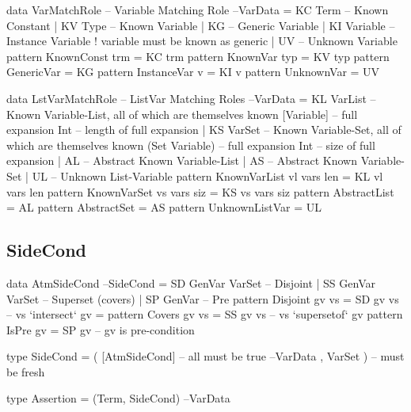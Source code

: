 \begin{code}
data VarMatchRole -- Variable Matching Role                          --VarData
  =  KC Term     -- Known Constant
  |  KV Type     -- Known Variable
  |  KG          -- Generic Variable
  |  KI Variable -- Instance Variable ! variable must be known as generic
  |  UV          -- Unknown Variable
pattern KnownConst trm = KC trm
pattern KnownVar typ   = KV typ
pattern GenericVar     = KG
pattern InstanceVar v  = KI v
pattern UnknownVar     = UV
\end{code}

\newpage
\begin{code}
data LstVarMatchRole -- ListVar Matching Roles                       --VarData
 = KL VarList        -- Known Variable-List, all of which are themselves known
      [Variable]     -- full expansion
      Int            -- length of full expansion
 | KS VarSet         -- Known Variable-Set, all of which are themselves known
      (Set Variable) -- full expansion
      Int            -- size of full expansion
 | AL                -- Abstract Known Variable-List
 | AS                -- Abstract Known Variable-Set
 | UL                -- Unknown List-Variable
pattern KnownVarList vl vars len  =  KL vl vars len
pattern KnownVarSet  vs vars siz  =  KS vs vars siz
pattern AbstractList              =  AL
pattern AbstractSet               =  AS
pattern UnknownListVar            =  UL
\end{code}

\subsection{SideCond}

\begin{code}
data AtmSideCond                                                    --SideCond
 = SD  GenVar VarSet -- Disjoint
 | SS  GenVar VarSet -- Superset (covers)
 | SP  GenVar        -- Pre
pattern Disjoint gv vs = SD  gv vs  --  vs `intersect`  gv = {}
pattern Covers   gv vs = SS  gv vs  --  vs `supersetof` gv
pattern IsPre    gv    = SP  gv     --  gv is pre-condition
\end{code}

\begin{code}
type SideCond = ( [AtmSideCond]  -- all must be true                 --VarData
                , VarSet )       -- must be fresh
\end{code}

\begin{code}
type Assertion = (Term, SideCond)                                    --VarData
\end{code}

